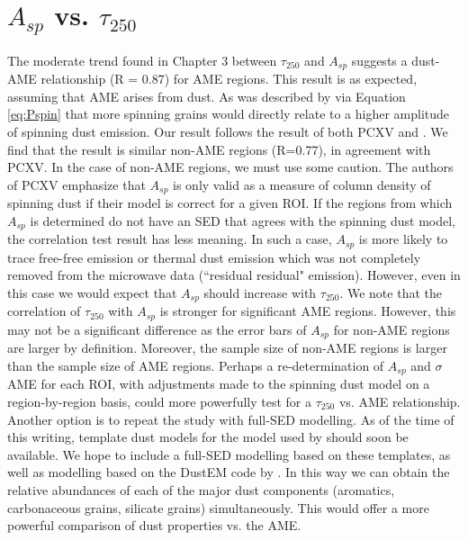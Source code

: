   \section{$A_{sp}$ vs. $\tau_{250}$}
     The moderate trend found in Chapter 3 between $\tau_{250}$ and $A_{sp}$ suggests a dust-AME relationship (R = 0.87) for AME regions. This result is as expected, assuming that AME arises from dust. As was described by \cite{draine98a} via Equation \ref{eq:Pspin} that more spinning grains would directly relate to a higher amplitude of spinning dust emission. Our result follows the result of both PCXV and \cite{ysard10a}. We find that the result is similar non-AME regions (R=0.77), in agreement with PCXV.
     In the case of non-AME regions,  we must use some caution. The authors of PCXV emphasize that $A_{sp}$ is only valid as a measure of column density of spinning dust if their model is correct for a given ROI. If the regions from which $A_{sp}$ is determined do not have an SED that agrees with the spinning dust model, the correlation test result has less meaning. In such a case, $A_{sp}$ is more likely to trace free-free emission or thermal dust emission which was not completely removed from the microwave data (``residual residual" emission). However, even in this case we would expect that $A_{sp}$ should increase with $\tau_{250}$. We note that the correlation of $\tau_{250}$ with $A_{sp}$ is stronger for significant AME regions. However, this may not be a significant difference as the error bars of $A_{sp}$ for non-AME regions are larger by definition. Moreover, the sample size of non-AME regions is larger than the sample size of AME regions. 
     Perhaps a re-determination of $A_{sp}$ and $\sigma$AME for each ROI, with adjustments made to the spinning dust model on a region-by-region basis, could more powerfully test for a $\tau_{250}$ vs. AME relationship. Another option is to repeat the study with full-SED modelling. As of the time of this writing, template dust models for the model used by \cite{galliano11} should soon be available. We hope to include a full-SED modelling based on these templates, as well as modelling based on the DustEM code by \cite{dustem11}. In this way we can obtain the relative abundances of each of the major dust components (aromatics, carbonaceous grains, silicate grains) simultaneously. This would offer a more powerful comparison of dust properties vs. the AME. 

